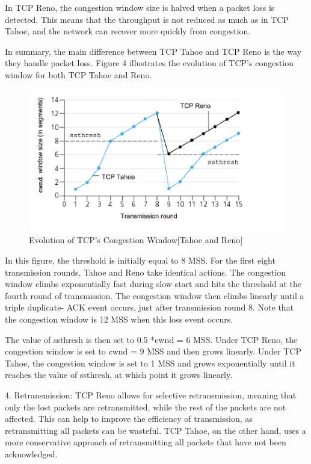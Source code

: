 \documentclass[11pt]{article}
\begin{document}
In TCP Reno, the congestion window size is halved when a packet loss is detected. This means that the throughput is not reduced as much as in TCP Tahoe, and the network can recover more quickly from congestion.

In summary, the main difference between TCP Tahoe and TCP Reno is the way they handle packet loss. Figure 4 illustrates the evolution of TCP’s congestion window for both TCP Tahoe and Reno.

  \begin{figure}[!h]
\centering
\includegraphics[width=\textwidth]{tahoe-reno.png}
\caption{Evolution of TCP's Congestion Window[Tahoe and Reno]  }
\end{figure}
\FloatBarrier

In this figure, the threshold is initially equal to 8 MSS. For the first eight transmission rounds, Tahoe and Reno take identical actions. The congestion window climbs exponentially fast during slow start and hits the threshold at the fourth round of transmission. The congestion window then climbs linearly until a triple duplicate- ACK event occurs, just after transmission round 8. Note that the congestion window is 12 MSS when this loss event occurs.

The value of ssthresh is then set to 0.5 *cwnd = 6 MSS. Under TCP Reno, the congestion window is set to cwnd = 9 MSS and then grows linearly. Under TCP Tahoe, the congestion window is set to 1 MSS and grows exponentially until it reaches the value of ssthresh, at which point it grows linearly.


4. Retransmission: TCP Reno allows for selective retransmission, meaning that only the lost packets are retransmitted, while the rest of the packets are not affected. This can help to improve the efficiency of transmission, as retransmitting all packets can be wasteful. TCP Tahoe, on the other hand, uses a more conservative approach of retransmitting all packets that have not been acknowledged.
\end{document}
